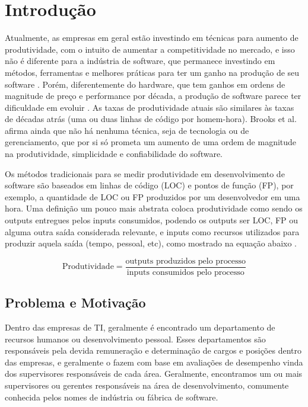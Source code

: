 \chapter[Introdução]{Introdução}

Atualmente, as empresas em geral estão investindo em técnicas para aumento de produtividade, com o intuito de aumentar a competitividade no mercado, e isso não é diferente para a indústria de software, que permanece investindo em métodos, ferramentas e melhores práticas para ter um ganho na produção de seu software \cite{deBarrosSampaio2010}.
Porém, diferentemente do hardware, que tem ganhos em ordens de magnitude de preço e performance por década, a produção de software parece ter dificuldade em evoluir \cite{Boehm1987}. As taxas de produtividade atuais são similares às taxas de décadas atrás (uma ou duas linhas de código por homem-hora)\cite{Boehm1987}. Brooks et al. \cite{BrooksJr1987} afirma ainda que não há nenhuma técnica, seja de tecnologia ou de gerenciamento, que por si só prometa um aumento de uma ordem de magnitude na produtividade, simplicidade e confiabilidade do software.

Os métodos tradicionais para se medir produtividade em desenvolvimento de software são baseados em linhas de código (LOC) e pontos de função (FP)\cite{Wagner2008}, por exemplo, a quantidade de LOC ou FP produzidos por um desenvolvedor em uma hora. Uma definição um pouco mais abstrata coloca produtividade como sendo os outputs entregues pelos inputs consumidos, podendo os outputs ser LOC, FP ou alguma outra saída considerada relevante, e inputs como recursos utilizados para produzir aquela saída (tempo, pessoal, etc), como mostrado na equação abaixo \cite{Boehm1987, Walston1977, Yu1991}.

\begin{equation}
\text{Produtividade} = \dfrac{\text{outputs produzidos pelo processo}}{\text{inputs consumidos pelo processo}}
\end{equation} 

\section{Problema e Motivação}\label{secao1.2}
Dentro das empresas de TI, geralmente é encontrado um departamento de recursos humanos ou desenvolvimento pessoal. Esses departamentos são responsáveis pela devida remuneração e determinação de cargos e posições dentro das empresas, e geralmente o fazem com base em avaliações de desempenho vinda dos supervisores responsáveis de cada área. Geralmente, encontramos um ou mais supervisores ou gerentes responsáveis na área de desenvolvimento, comumente conhecida pelos nomes de indústria ou fábrica de software.

